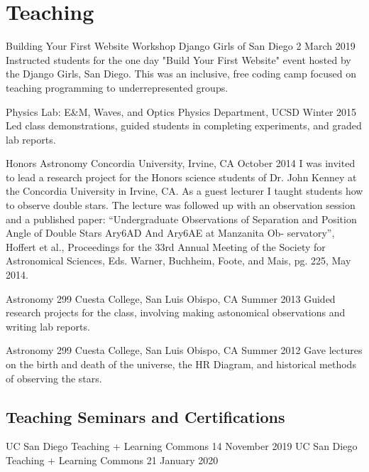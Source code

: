 \section{Teaching}

    {Building Your First Website Workshop}
    {Django Girls of San Diego}
    {2 March 2019}
Instructed students for the one day "Build Your First Website" event hosted by the Django Girls, San Diego.
This was an inclusive, free coding camp focused on teaching programming to underrepresented groups.

    {Physics Lab: E\&M, Waves, and Optics}
    {Physics Department, UCSD}
    {Winter 2015} 
Led class demonstrations, guided students in completing experiments, and graded lab reports.

    {Honors Astronomy}
    {Concordia University, Irvine, CA}
    {October 2014}
I was invited to lead a research project for the Honors science students of Dr. John Kenney at the Concordia University in Irvine, CA. As a guest lecturer I taught students how to observe double stars. The lecture was followed up with an observation session and a published paper:
``Undergraduate Observations of Separation and Position Angle of Double Stars Ary6AD And Ary6AE at Manzanita Ob- servatory'', Hoffert et al., Proceedings for the 33rd Annual Meeting of the Society for Astronomical Sciences, Eds. Warner, Buchheim, Foote, and Mais, pg. 225, May 2014.

    {Astronomy 299}
    {Cuesta College, San Luis Obispo, CA}
    {Summer 2013}
Guided research projects for the class, involving making astonomical observations and writing lab reports.

    {Astronomy 299}
    {Cuesta College, San Luis Obispo, CA}
    {Summer 2012}
Gave lectures on the birth and death of the universe, the HR Diagram, and historical methods of observing the stars.

\subsection{Teaching Seminars and Certifications}
    {UC San Diego Teaching + Learning Commons}
    {14 November 2019}
    {UC San Diego Teaching + Learning Commons}
    {21 January 2020}
